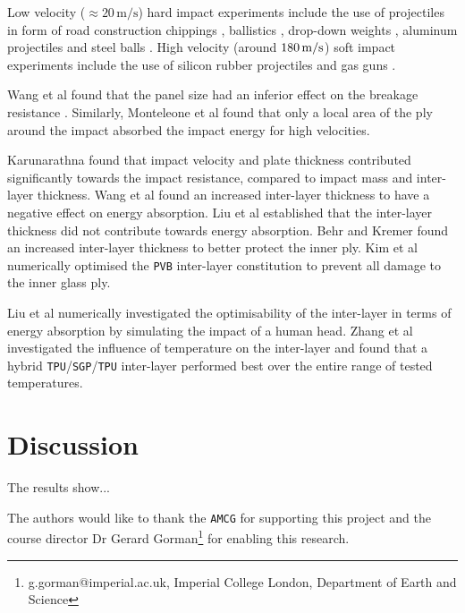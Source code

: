 \documentclass[format=acmtog,12pt,screen=true,review=false,natbib=false,]{acmart}
\begin{document}
\bigbreak
Low velocity ($\approx 20\,\mathrm{m}/\mathrm{s}$) hard impact experiments include the use of projectiles in form of road construction chippings \cite{Gra98}, ballistics \cite{Mon04}, drop-down weights \cite{Che15, Mil12, Wan18}, aluminum projectiles \cite{Mil12} and steel balls \cite{Beh99, Flo98, Wan18}. High velocity (around $180\, {\rm{m}}/{\rm{s}}$) soft impact experiments include the use of silicon rubber projectiles \cite{Moh17} and gas guns \cite{Moh18}.

\bigbreak
Wang et al \cite{Wan18} found that the panel size had an inferior effect on the breakage resistance \cite{Wan18}. Similarly, Monteleone et al \cite{Mon04} found that only a local area of the ply around the impact absorbed the impact energy for high velocities.

\bigbreak
Karunarathna \cite{Kar14} found that impact velocity and plate thickness contributed significantly towards the impact resistance, compared to impact mass and inter-layer thickness. Wang et al \cite{Wan18} found an increased inter-layer thickness to have a negative effect on energy absorption. Liu et al \cite{Liu16} established that the inter-layer thickness did not contribute towards energy absorption. Behr and Kremer \cite{Beh99} found an increased inter-layer thickness to better protect the inner ply. Kim et al \cite{Kim16} numerically optimised the \texttt{PVB} inter-layer constitution to prevent all damage to the inner glass ply.

\bigbreak
Liu et al \cite{Liu16} numerically investigated the optimisability of the inter-layer in terms of energy absorption by simulating the impact of a human head. Zhang et al \cite{Zha19} investigated the influence of temperature on the inter-layer and found that a hybrid \texttt{TPU}/\texttt{SGP}/\texttt{TPU} inter-layer performed best over the entire range of tested temperatures.

\section{Discussion}

The results show...

\begin{acks}
The authors would like to thank the \texttt{AMCG} for supporting this project and the course director Dr Gerard Gorman\footnote{g.gorman@imperial.ac.uk, Imperial College London, Department of Earth and Science} for enabling this research.
\end{acks}
\end{document}
